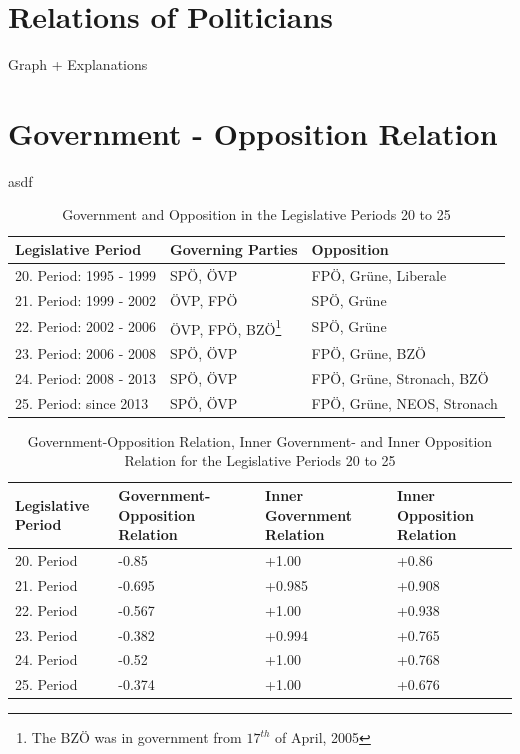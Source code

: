 \section{Relations of Politicians}
Graph + Explanations

\section{Government - Opposition Relation}
\label{sec:gov_opp_relation}

asdf

\begin{table}[h]

\centering
\bgroup
\def\arraystretch{1.2}
\begin{tabular}{| p{4cm} | p{3cm} | l |}
\hline
  Legislative Period & Governing Parties & Opposition  \\
\hline
\hline
  20. Period: 1995 - 1999 & SPÖ, ÖVP & FPÖ, Grüne, Liberale \\
\hline
  21. Period: 1999 - 2002 & ÖVP, FPÖ & SPÖ, Grüne \\
\hline
  22. Period: 2002 - 2006 & ÖVP, FPÖ, BZÖ\footnote{The BZÖ was in government from $17^{th}$ of April, 2005} & SPÖ, Grüne \\
\hline
  23. Period: 2006 - 2008 & SPÖ, ÖVP & FPÖ, Grüne, BZÖ \\
\hline
  24. Period: 2008 - 2013 & SPÖ, ÖVP & FPÖ, Grüne, Stronach, BZÖ \\
\hline
  25. Period: since 2013 & SPÖ, ÖVP & FPÖ, Grüne, NEOS, Stronach \\
\hline

\end{tabular}
\egroup
\caption{Government and Opposition in the Legislative Periods 20 to 25}
\label{table:gov_opp_parties}
\end{table}



\begin{table}[h]

\centering
\bgroup
\def\arraystretch{1.2}
\begin{tabular}{| p{2cm} | p{3cm} | p{3cm} | p{3cm} |}
\hline
  Legislative Period & Government-Opposition Relation & Inner Government Relation & Inner Opposition Relation \\
\hline
\hline
  20. Period & -0.85 & +1.00 & +0.86 \\
\hline
  21. Period & -0.695 & +0.985 & +0.908 \\
\hline
  22. Period & -0.567 & +1.00 & +0.938 \\
\hline
  23. Period & -0.382 & +0.994 & +0.765\\
\hline
  24. Period & -0.52 & +1.00 & +0.768\\
\hline
  25. Period & -0.374 & +1.00 & +0.676\\
\hline

\end{tabular}
\egroup
\caption{Government-Opposition Relation, Inner Government- and Inner Opposition Relation for the Legislative Periods 20 to 25}
\label{table:gov_opp_relation}
\end{table}